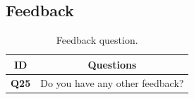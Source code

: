\subsection*{Feedback} 
\begin{table}[H]
    \centering
    \begin{tabularx}{\textwidth}{|c|X|}
        \hline
        \textbf{ID} & \multicolumn{1}{c|}{\textbf{Questions}} \\ \hline
        \textbf{Q25} & Do you have any other feedback?  \\ \hline
    \end{tabularx}
    \caption{Feedback question.}
    \label{tab:appendix_feedback_questions}
\end{table}
